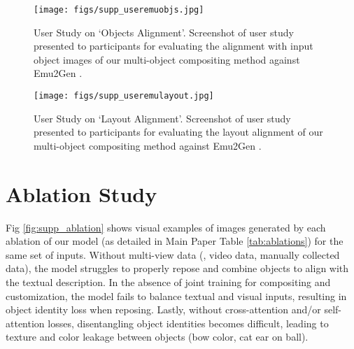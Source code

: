 \begin{figure}[t]
    \centering
    \texttt{[image: figs/supp\_useremuobjs.jpg]}
    \caption{User Study on `Objects Alignment'. Screenshot of user study presented to participants for evaluating the alignment with input object images of our multi-object compositing method against Emu2Gen \cite{sun2024emugen}.}

    \label{fig:supp_userobjs}
\end{figure}

\begin{figure}[t]
    \centering
    \texttt{[image: figs/supp\_useremulayout.jpg]}
    \caption{User Study on `Layout Alignment'. Screenshot of user study presented to participants for evaluating the layout alignment of our multi-object compositing method against Emu2Gen \cite{sun2024emugen}.}

    \label{fig:supp_userlayout}
\end{figure}

\section{Ablation Study}



Fig \ref{fig:supp_ablation} shows visual examples of images generated by each ablation of our model (as detailed in Main Paper Table \ref{tab:ablations}) for the same set of inputs. Without multi-view data (\ie, video data, manually collected data), the model struggles to properly repose and combine objects to align with the textual description. In the absence of joint training for compositing and customization, the model fails to balance textual and visual inputs, resulting in object identity loss when reposing. Lastly, without cross-attention and/or self-attention losses, disentangling object identities becomes difficult, leading to texture and color leakage between objects (\eg bow color, cat ear on ball).




